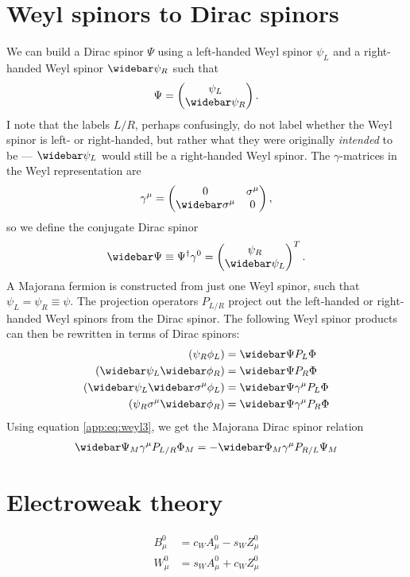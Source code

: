 \documentclass[english, notitlepage]{article}
\begin{document}
\section{Weyl spinors to Dirac spinors}
    We can build a Dirac spinor $\Psi$ using a left-handed Weyl spinor $\psi_L$ and a right-handed Weyl spinor $\wbar{\psi}_R$ such that
    \begin{align}
        \Psi = \begin{pmatrix} \psi_L \\ \wbar{\psi}_R \end{pmatrix}.
    \end{align}
    I note that the labels \(L/R\), perhaps confusingly, do not label whether the Weyl spinor is left- or right-handed, but rather what they were originally \textit{intended} to be --- \(\wbar{\psi}_L\) would still be a right-handed Weyl spinor.
    The $\gamma$-matrices in the Weyl representation are
    \begin{align}
        \gamma^\mu = \begin{pmatrix} 0 & \sigma^\mu \\ \wbar{\sigma}^\mu & 0 \end{pmatrix},
    \end{align}
    so we define the conjugate Dirac spinor
    \begin{align}
        \wbar{\Psi} \equiv \Psi^\dag \gamma^0 = \begin{pmatrix} \psi_R \\ \wbar{\psi}_L \end{pmatrix}^T.
    \end{align}
    A Majorana fermion is constructed from just one Weyl spinor, such that $\psi_L = \psi_R \equiv \psi$.
    The projection operators $P_{L/R}$ project out the left-handed or right-handed Weyl spinors from the Dirac spinor. The following Weyl spinor products can then be rewritten in terms of Dirac spinors:
    \begin{subequations}
        \begin{align}
            (\psi_{R} \phi_{L})                      & = \wbar{\Psi} P_L \Phi            \\
            (\wbar{\psi}_L \wbar{\phi}_R)            & = \wbar{\Psi} P_R \Phi            \\
            (\wbar{\psi}_L \wbar{\sigma}^\mu \phi_L) & = \wbar{\Psi} \gamma^\mu P_L \Phi \\
            (\psi_R \sigma^\mu \wbar{\phi}_R)        & = \wbar{\Psi} \gamma^\mu P_R \Phi
        \end{align}
    \end{subequations}
    Using equation \cref{app:eq:weyl3}, we get the Majorana Dirac spinor relation
    \begin{align}
        \wbar{\Psi}_M \gamma^\mu P_{L/R} \Phi_M = -\wbar{\Phi}_M \gamma^\mu P_{R/L} \Psi_M
    \end{align}

\section{Electroweak theory}
    \begin{subequations}
        \begin{align}
            B^0_\mu & = c_W A^0_\mu - s_W Z^0_\mu \\
            W^0_\mu & = s_W A^0_\mu + c_W Z^0_\mu
        \end{align}
    \end{subequations}
\end{document}
